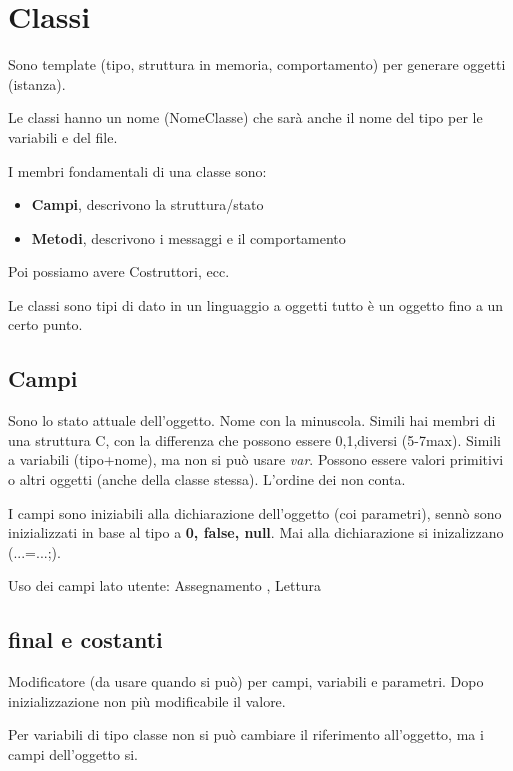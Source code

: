 \section{Classi}
Sono template (tipo, struttura in memoria, comportamento) per generare oggetti (istanza).

Le classi hanno un nome (NomeClasse) che sarà anche il nome del tipo per le variabili e del file.

I membri fondamentali di una classe sono:
\begin{itemize}
	\item \textbf{Campi}, descrivono la struttura/stato
	\item \textbf{Metodi}, descrivono i messaggi e il comportamento
\end{itemize}
Poi possiamo avere Costruttori, ecc.

Le classi sono tipi di dato in un linguaggio a oggetti tutto è un oggetto fino a un certo punto.


\subsection{Campi}
Sono lo stato attuale dell'oggetto. Nome con la minuscola.
Simili hai membri di una struttura C, con la differenza che possono essere 0,1,diversi (5-7max). Simili a variabili (tipo+nome), ma non si può usare \textit{var}.
Possono essere valori primitivi o altri oggetti (anche della classe stessa).
L'ordine dei non conta.

I campi sono iniziabili alla dichiarazione dell'oggetto (coi parametri), sennò sono inizializzati in base al tipo a \textbf{0, false, null}. Mai alla dichiarazione si inizalizzano (...=...;).


Uso dei campi lato utente: Assegnamento , Lettura 

\subsection{final e costanti}
Modificatore (da usare quando si può) per campi, variabili e parametri. Dopo inizializzazione non più modificabile il valore.

Per variabili di tipo classe non si può cambiare il riferimento all'oggetto, ma i campi dell'oggetto si.

